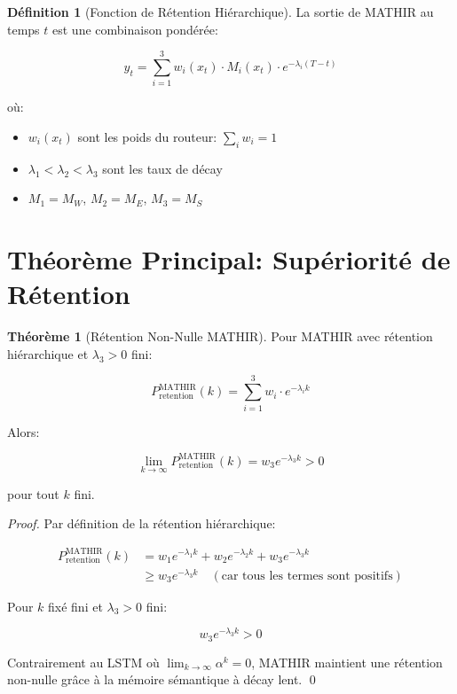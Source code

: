 \documentclass[12pt]{article}
\theoremstyle{definition}
\newtheorem{theorem}{Théorème}
\newtheorem{definition}{Définition}
\begin{document}
\begin{definition}[Fonction de Rétention Hiérarchique]
La sortie de MATHIR au temps $t$ est une combinaison pondérée:

\begin{equation}
y_t = \sum_{i=1}^{3} w_i(x_t) \cdot M_i(x_t) \cdot e^{-\lambda_i (T-t)}
\end{equation}

où:
\begin{itemize}
\item $w_i(x_t)$ sont les poids du routeur: $\sum_i w_i = 1$
\item $\lambda_1 < \lambda_2 < \lambda_3$ sont les taux de décay
\item $M_1 = M_W$, $M_2 = M_E$, $M_3 = M_S$
\end{itemize}
\end{definition}

\section{Théorème Principal: Supériorité de Rétention}

\begin{theorem}[Rétention Non-Nulle MATHIR]
Pour MATHIR avec rétention hiérarchique et $\lambda_3 > 0$ fini:

\begin{equation}
P_{\text{retention}}^{\text{MATHIR}}(k) = \sum_{i=1}^{3} w_i \cdot e^{-\lambda_i k}
\end{equation}

Alors:

\begin{equation}
\lim_{k \to \infty} P_{\text{retention}}^{\text{MATHIR}}(k) = w_3 e^{-\lambda_3 k} > 0
\end{equation}

pour tout $k$ fini.
\end{theorem}

\begin{proof}
Par définition de la rétention hiérarchique:

\begin{align}
P_{\text{retention}}^{\text{MATHIR}}(k) 
&= w_1 e^{-\lambda_1 k} + w_2 e^{-\lambda_2 k} + w_3 e^{-\lambda_3 k} \\
&\geq w_3 e^{-\lambda_3 k} \quad (\text{car tous les termes sont positifs})
\end{align}

Pour $k$ fixé fini et $\lambda_3 > 0$ fini:

\begin{equation}
w_3 e^{-\lambda_3 k} > 0
\end{equation}

Contrairement au LSTM où $\lim_{k \to \infty} \alpha^k = 0$, MATHIR 
maintient une rétention non-nulle grâce à la mémoire sémantique à décay lent. \qed
\end{proof}
\end{document}
